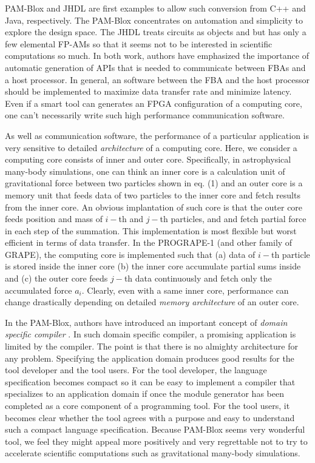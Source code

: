 \documentclass{article}
\begin{document}
PAM-Blox\cite{MMF97} and JHDL\cite{BH98} are first examples
to allow such conversion from C++ and Java, respectively.
The PAM-Blox concentrates on automation and simplicity to explore the design space.
The JHDL treats circuits as objects and but has only a few elemental FP-AMs
so that it seems not to be interested in scientific computations so much.  
In both work, authors have emphasized the importance of automatic
generation of APIs that is needed to communicate between FBAs and a host processor.
In general, an software between the FBA and the host processor
should be implemented to maximize data transfer rate and minimize latency.
Even if a smart tool can generates an FPGA configuration of a computing core,
one can't necessarily write such high performance communication software.

As well as communication software, 
the performance of a particular application
is very sensitive to detailed {\it architecture} of a computing core.
Here, we consider a computing core consists of inner and outer core.
Specifically, in astrophysical many-body simulations,
one can think an inner core is a calculation unit of gravitational force between two particles
shown in eq. (1) and an outer core is a memory unit that feeds data of two particles 
to the inner core and fetch results from the inner core. 
An obvious implantation of such core is that the outer core
feeds position and mass of $i-$th and $j-$th particles, and
and fetch partial force in each step of the summation.
This implementation is most flexible but worst efficient in terms of data transfer.
In the PROGRAPE-1 (and other family of GRAPE\cite{MT98}),
the computing core is implemented such that
(a) data of $i-$th particle is stored inside the inner core
(b) the inner core accumulate partial sums inside
and (c) the outer core feeds $j-$th data continuously and 
fetch only the accumulated force $a_{i}$.
Clearly, even with a same inner core, performance 
can change drastically depending on detailed {\it memory architecture} of an outer core.

In the PAM-Blox\cite{MMF97}, authors have introduced an important concept
of {\it domain specific compiler} \cite{MPMF01}. 
In such domain specific compiler, a promising application is limited by the
compiler. The point is that there is no almighty architecture for any problem.
Specifying the application domain produces good results for
the tool developer and the tool users.  For the tool developer, the
language specification becomes compact so it can be easy to implement
a compiler that specializes to an application domain if once the
module generator has been completed as a core component of a
programming tool.  For the tool users, it becomes clear whether the
tool agrees with a purpose and easy to understand such a compact
language specification.
Because PAM-Blox seems very wonderful tool, we feel they might appeal
more positively and very regrettable not to try to accelerate 
scientific computations such as gravitational many-body simulations.
\end{document}
